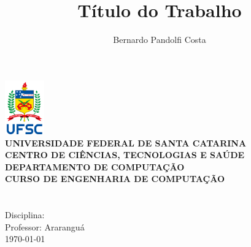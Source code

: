 \documentclass[a4paper,12pt]{article}
\author{Bernardo Pandolfi Costa}
\title{Título do Trabalho}
\begin{document}
\makeatletter
\begin{titlepage}
    \begin{center}
    \includegraphics[width=64px]{./assets/vertical_sigla_fundo_claro.png}\\
        \small
        \vspace{0.25cm}
        \textbf{UNIVERSIDADE FEDERAL DE SANTA CATARINA}\\
		\textbf{CENTRO DE CIÊNCIAS, TECNOLOGIAS E SAÚDE}\\
		\textbf{DEPARTAMENTO DE COMPUTAÇÃO}\\
		\textbf{CURSO DE ENGENHARIA DE COMPUTAÇÃO}\\
        \vspace{7cm}
        \Large
        \textbf{\@title}\\
        \vspace{0.5cm}
        \normalsize
        \textbf{\@author}\\
        \vspace{1.5cm}
        \small
        Disciplina:\\
        Professor:
        \vfill
        Araranguá\\
        \today
    \end{center}
\end{titlepage}
\makeatother

\tableofcontents
\newpage

\end{document}
